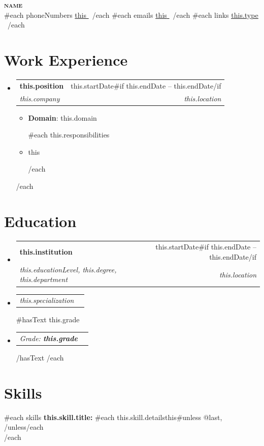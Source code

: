 \documentclass[letterpaper,11pt]{article}
\makeatletter
\newcommand{\resumeItem}[1]{
  \item\small{
    {#1 \vspace{-2pt}}
  }
}
\newcommand{\resumeSubheading}[4]{
  \vspace{-2pt}\item
    \begin{tabular*}{0.97\textwidth}[t]{l@{\extracolsep{\fill}}r}
      \textbf{#1} & #2 \\
      \textit{\small#3} & \textit{\small #4} \\
    \end{tabular*}\vspace{-7pt}
}
\newcommand{\resumeSubSubheading}[2]{
    \item
    \begin{tabular*}{0.97\textwidth}{l@{\extracolsep{\fill}}r}
      \textit{\small#1} & \textit{\small #2} \\
    \end{tabular*}\vspace{-7pt}
}
\newcommand{\resumeSubHeadingListStart}{\begin{itemize}[leftmargin=0.15in, label={}]}
\newcommand{\resumeSubHeadingListEnd}{\end{itemize}}
\newcommand{\resumeItemListStart}{\begin{itemize}}
\newcommand{\resumeItemListEnd}{\end{itemize}\vspace{-5pt}}
\makeatother
\begin{document}
\begin{center}
  \textbf{\Huge\scshape {{name}} } \\ \vspace{1pt}
  {{#each phoneNumbers}} \small{\underline{ {{this}} }}\, {{/each}}
  {{#each emails}} \small{\underline{ {{this}} }}\, {{/each}}
  {{#each links}} \small{\href{ {{this.url}} }{\underline{ {{this.type}} }}}\, {{/each}}
\end{center}

\section{Work Experience}
  \resumeSubHeadingListStart
  {{#each workExperiences}}
    \resumeSubheading
    { {{this.position}} }{ {{this.startDate}}{{#if this.endDate}} -- {{this.endDate}}{{/if}} }
        { {{this.company}} }{ {{this.location}} }
        \resumeItemListStart
          \resumeItem{\textbf{Domain}: {{this.domain}} }
          {{#each this.responsibilities}}
          \resumeItem{ {{this}} }
          {{/each}}
        \resumeItemListEnd
  {{/each}}
  \resumeSubHeadingListEnd

\section{Education}
  \resumeSubHeadingListStart
  {{#each educations}}
    \resumeSubheading
    { {{this.institution}} } { {{this.startDate}}{{#if this.endDate}} -- {{this.endDate}}{{/if}} }
        { {{this.educationLevel}}, {{this.degree}}, {{this.department}} }{ {{this.location}} }
        \resumeSubSubheading
          { {{this.specialization}} }
          {}
        {{#hasText this.grade}}
        \resumeSubSubheading
          { Grade:\textbf{ {{this.grade}} }}
          {}
        {{/hasText}}
  {{/each}}
  \resumeSubHeadingListEnd

\section{Skills}
 \begin{itemize}[leftmargin=0.15in, label={}]
    \small{\item{
      {{#each skills}}
        \textbf{ {{this.skill.title}}: }{ {{#each this.skill.details}}{{this}}{{#unless @last}}, {{/unless}}{{/each}} } \\
      {{/each}}
    }}
 \end{itemize}
\end{document}
